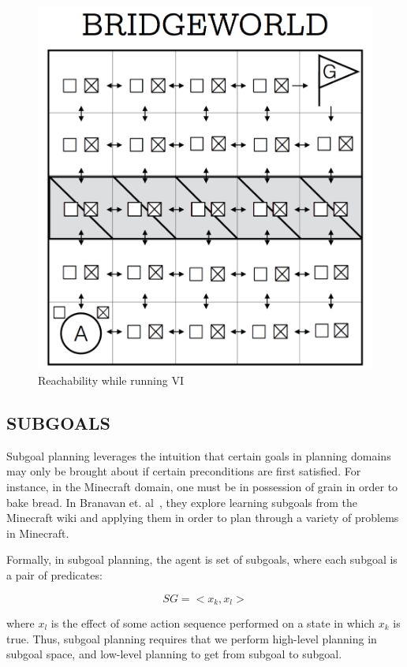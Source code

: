 \documentclass[]{article}
\begin{document}

\begin{figure}
\centering
\includegraphics[scale = 0.24]{figures/bridgeworld_vi.png}
\caption{Reachability while running VI}
\end{figure}

\subsection{SUBGOALS}
Subgoal planning leverages the intuition that certain goals in planning domains may only be brought about if certain preconditions are first satisfied. For instance, in the Minecraft domain, one must be in possession of grain in order to bake bread. In Branavan et. al~\citep{branavan}, they explore learning subgoals from the Minecraft wiki and applying them in order to plan through a variety of problems in Minecraft.

Formally, in subgoal planning, the agent is set of subgoals, where each subgoal is a pair of predicates:

\[ 
SG = <x_k, x_l >
\]

where $x_l$ is the effect of some action sequence performed on a state in which $x_k$ is true. Thus, subgoal planning requires that we perform high-level planning in subgoal space, and low-level planning to get from subgoal to subgoal.
\end{document}
